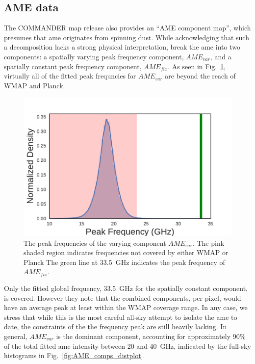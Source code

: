       \subsection{AME data}
          The COMMANDER map release also provides an ``AME component map'', which presumes that \acrshort{ame} originates from spinning dust. While acknowledging that such a decomposition lacks a strong physical interpretation, \cite{planck15X} break the \acrshort{ame} into two components: a spatially varying peak frequency component, $AME_{var}$, and a spatially constant peak frequency component, $AME_{fix}$. As seen in Fig.~\ref{fig:AME_commander_freqdist}, virtually all of the fitted peak frequncies for $AME_{var}$ are beyond the reach of WMAP and Planck.
              \begin{figure}
                \includegraphics[width=\textwidth]{../Plots/ch_intro/AME_commander_freqdist.pdf}
                \centering
                \caption{The peak frequencies of the varying component $AME_{var}$.  The pink shaded region indicates frequencies not covered by either WMAP or Planck The green line at 33.5~GHz indicates the peak frequency of $AME_{fix}$.}
                \label{fig:AME_commander_freqdist}
              \end{figure}
          Only the fitted global frequency, 33.5~GHz for the spatially constant component, is covered. However they note that the combined components, per pixel, would have an average peak  at least within the WMAP coverage range. In any case, we stress that while this is the most careful all-sky attempt to isolate the \acrshort{ame} to date, the constraints of the the frequency peak are still heavily lacking. In general, $AME_{var}$ is the dominant component, accounting for approximately 90\% of the total fitted \acrshort{ame} intensity between 20 and 40~GHz, indicated by the full-sky histograms in Fig.~\ref{fig:AME_comps_distplot}.
